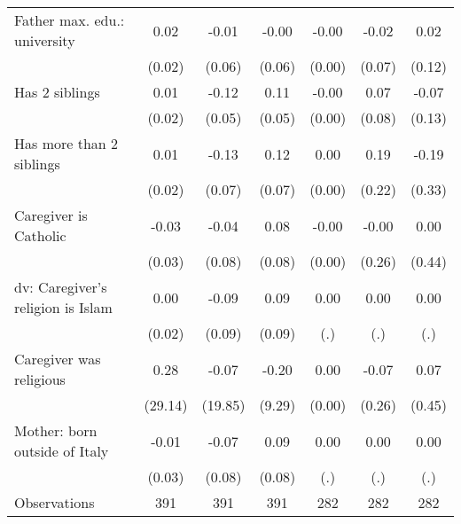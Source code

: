 {\begin{tabular}{l*{6}{c}}
\addlinespace
Father max. edu.: university&        0.02         &       -0.01         &       -0.00         &       -0.00         &       -0.02         &        0.02         \\
                    &      (0.02)         &      (0.06)         &      (0.06)         &      (0.00)         &      (0.07)         &      (0.12)         \\
\addlinespace
Has 2 siblings      &        0.01         &       -0.12\sym{*}  &        0.11\sym{*}  &       -0.00         &        0.07         &       -0.07         \\
                    &      (0.02)         &      (0.05)         &      (0.05)         &      (0.00)         &      (0.08)         &      (0.13)         \\
\addlinespace
Has more than 2 siblings&        0.01         &       -0.13         &        0.12         &        0.00         &        0.19         &       -0.19         \\
                    &      (0.02)         &      (0.07)         &      (0.07)         &      (0.00)         &      (0.22)         &      (0.33)         \\
\addlinespace
Caregiver is Catholic&       -0.03         &       -0.04         &        0.08         &       -0.00         &       -0.00         &        0.00         \\
                    &      (0.03)         &      (0.08)         &      (0.08)         &      (0.00)         &      (0.26)         &      (0.44)         \\
\addlinespace
dv: Caregiver's religion is Islam&        0.00         &       -0.09         &        0.09         &        0.00         &        0.00         &        0.00         \\
                    &      (0.02)         &      (0.09)         &      (0.09)         &         (.)         &         (.)         &         (.)         \\
\addlinespace
Caregiver was religious&        0.28         &       -0.07         &       -0.20         &        0.00         &       -0.07         &        0.07         \\
                    &     (29.14)         &     (19.85)         &      (9.29)         &      (0.00)         &      (0.26)         &      (0.45)         \\
\addlinespace
Mother: born outside of Italy&       -0.01         &       -0.07         &        0.09         &        0.00         &        0.00         &        0.00         \\
                    &      (0.03)         &      (0.08)         &      (0.08)         &         (.)         &         (.)         &         (.)         \\
\midrule
Observations        &         391         &         391         &         391         &         282         &         282         &         282         \\
\bottomrule
\end{tabular}
}
